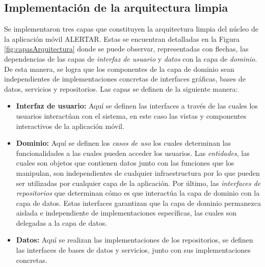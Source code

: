 \subsection{Implementación de la arquitectura limpia}
Se implementaron tres capas que constituyen la arquitectura limpia del núcleo de la aplicación móvil ALERTAR. Estas se encuentran detalladas en la Figura \ref{fig:capasArquitectura} donde se puede observar, representadas con flechas, las dependencias de las capas de \textit{interfaz de usuario} y \textit{datos} con la capa de \textit{dominio}. De esta manera, se logra que los componentes de la capa de dominio sean independientes de implementaciones concretas de interfaces gráficas, bases de datos, servicios y repositorios. Las capas se definen de la siguiente manera:

\begin{itemize}
    \item \textbf{Interfaz de usuario: }Aquí se definen las interfaces a través de las cuales los usuarios interactúan con el sistema, en este caso las vistas y componentes interactivos de la aplicación móvil.
    
    \item \textbf{Dominio: }Aquí se definen los \textit{casos de uso} los cuales determinan las funcionalidades a las cuales pueden acceder los usuarios. Las \textit{entidades}, las cuales son objetos que contienen datos junto con las funciones que los manipulan, son independientes de cualquier infraestructura por lo que pueden ser utilizadas por cualquier capa de la aplicación. Por último, las \textit{interfaces de repositorios} que determinan cómo es que interactúa la capa de dominio con la capa de datos. Estas interfaces garantizan que la capa de dominio permanezca aislada e independiente de implementaciones específicas, las cuales son delegadas a la capa de datos.

    \item \textbf{Datos: }Aquí se realizan las implementaciones de los repositorios, se definen las interfaces de bases de datos y servicios, junto con sus implementaciones concretas.
\end{itemize}

